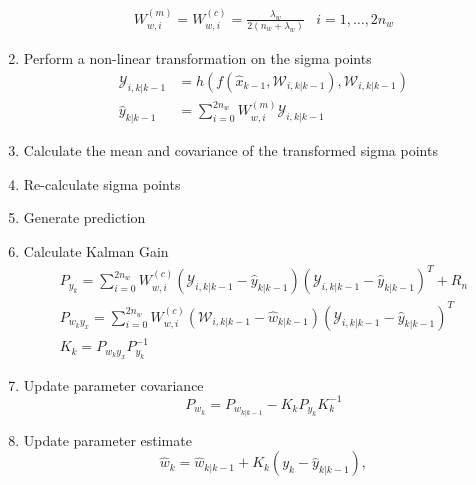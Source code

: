 \begin{enumerate}
\begin{align}
        W^{(m)}_{w,i} = W^{(c)}_{w,i} = \frac{\lambda_{w}}{2(n_{w}+ \lambda_{w}) } & i=1,\dots,2n_{w} 
    \end{align}
    \item Perform a non-linear transformation on the sigma points
    \begin{align}
        \mathcal{Y}_{i,k|k-1} &= h(f(\hat{x}_{k-1},\mathcal{W}_{i,k|k-1}),\mathcal{W}_{i,k|k-1}) \\
        \hat{y}_{k|k-1} &= \sum_{i=0}^{2n_{w}} W^{(m)}_{w,i} \mathcal{Y}_{i,k|k-1}
    \end{align}
    \item Calculate the mean and covariance of the transformed sigma points
    \item Re-calculate sigma points
    \item Generate prediction
    \item Calculate Kalman Gain
    \begin{align}
        P_{y_{k}} = \sum_{i=0}^{2n_{w}} W^{(c)}_{w,i} (\mathcal{Y}_{i, k|k-1} - \hat{y}_{k|k-1})(\mathcal{Y}_{i, k|k-1} - \hat{y}_{k|k-1})^{T} + R_{n} \\
        P_{w_{k}y_{x}} = \sum_{i=0}^{2n_{w}} W^{(c)}_{w,i} (\mathcal{W}_{i,k|k-1} - \hat{w}_{k|k-1})(\mathcal{Y}_{i, k|k-1} - \hat{y}_{k|k-1})^{T} \\
        K_{k} = P_{w_{k}y_{x}}P^{-1}_{y_{k}}
    \end{align}
    \item Update parameter covariance
    \begin{equation}
        P_{w_{k}} = P_{w_{k|k-1}} - K_{k}P_{y_{k}}K^{-1}_{k}
    \end{equation}
    \item Update parameter estimate
    \begin{equation}
        \hat{w}_{k} = \hat{w}_{k|k-1} + K_{k}(y_{k}-\hat{y}_{k|k-1}),
    \end{equation}
    
\end{enumerate}